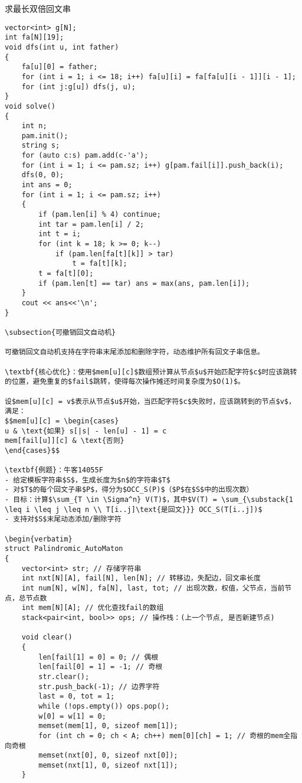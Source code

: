 \documentclass[a4paper, fontset=none]{ctexart}
\begin{document}
求最长双倍回文串

\begin{verbatim}
vector<int> g[N];
int fa[N][19];
void dfs(int u, int father)
{
    fa[u][0] = father;
    for (int i = 1; i <= 18; i++) fa[u][i] = fa[fa[u][i - 1]][i - 1];
    for (int j:g[u]) dfs(j, u);
}
void solve()
{
    int n;
    pam.init();
    string s;
    for (auto c:s) pam.add(c-'a');
    for (int i = 1; i <= pam.sz; i++) g[pam.fail[i]].push_back(i);
    dfs(0, 0);
    int ans = 0;
    for (int i = 1; i <= pam.sz; i++)
    {
        if (pam.len[i] % 4) continue;
        int tar = pam.len[i] / 2;
        int t = i;
        for (int k = 18; k >= 0; k--)
            if (pam.len[fa[t][k]] > tar)
                t = fa[t][k];
        t = fa[t][0];
        if (pam.len[t] == tar) ans = max(ans, pam.len[i]);
    }
    cout << ans<<'\n';
}

\subsection{可撤销回文自动机}

可撤销回文自动机支持在字符串末尾添加和删除字符，动态维护所有回文子串信息。

\textbf{核心优化}：使用$mem[u][c]$数组预计算从节点$u$开始匹配字符$c$时应该跳转的位置，避免重复的$fail$跳转，使得每次操作摊还时间复杂度为$O(1)$。

设$mem[u][c] = v$表示从节点$u$开始，当匹配字符$c$失败时，应该跳转到的节点$v$，满足：
$$mem[u][c] = \begin{cases}
u & \text{如果} s[|s| - len[u] - 1] = c
mem[fail[u]][c] & \text{否则}
\end{cases}$$

\textbf{例题}：牛客14055F
- 给定模板字符串$S$，生成长度为$n$的字符串$T$
- 对$T$的每个回文子串$P$，得分为$OCC_S(P)$（$P$在$S$中的出现次数）
- 目标：计算$\sum_{T \in \Sigma^n} V(T)$，其中$V(T) = \sum_{\substack{1 \leq i \leq j \leq n \\ T[i..j]\text{是回文}}} OCC_S(T[i..j])$
- 支持对$S$末尾动态添加/删除字符

\begin{verbatim}
struct Palindromic_AutoMaton
{
    vector<int> str; // 存储字符串
    int nxt[N][A], fail[N], len[N]; // 转移边，失配边，回文串长度
    int num[N], w[N], fa[N], last, tot; // 出现次数，权值，父节点，当前节点，总节点数
    int mem[N][A]; // 优化查找fail的数组
    stack<pair<int, bool>> ops; // 操作栈：(上一个节点, 是否新建节点)

    void clear()
    {
        len[fail[1] = 0] = 0; // 偶根
        len[fail[0] = 1] = -1; // 奇根
        str.clear();
        str.push_back(-1); // 边界字符
        last = 0, tot = 1;
        while (!ops.empty()) ops.pop();
        w[0] = w[1] = 0;
        memset(mem[1], 0, sizeof mem[1]);
        for (int ch = 0; ch < A; ch++) mem[0][ch] = 1; // 奇根的mem全指向奇根
        memset(nxt[0], 0, sizeof nxt[0]);
        memset(nxt[1], 0, sizeof nxt[1]);
    }


\end{verbatim}
\end{document}
